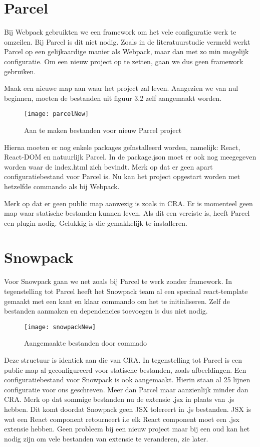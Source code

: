 \section{Parcel}
Bij Webpack gebruikten we een framework om het vele configuratie werk te omzeilen. Bij Parcel is dit niet nodig. Zoals in de literatuurstudie vermeld werkt Parcel op een gelijkaardige manier als Webpack, maar dan met zo min mogelijk configuratie. Om een nieuw project op te zetten, gaan we dus geen framework gebruiken.

Maak een nieuwe map aan waar het project zal leven. Aangezien we van nul beginnen, moeten de bestanden uit figuur 3.2 zelf aangemaakt worden.

\begin{figure}[h]
   \texttt{[image: parcelNew]}
       \centering
       \caption{Aan te maken bestanden voor nieuw Parcel project}
   \end{figure}

Hierna moeten er nog enkele packages geïnstalleerd worden, namelijk: React, React-DOM en natuurlijk Parcel. In de package.json moet er ook nog meegegeven worden waar de index.html zich bevindt. Merk op dat er geen apart configuratiebestand voor Parcel is. Nu kan het project opgestart worden met hetzelfde commando als bij Webpack.

 Merk op dat er geen public map aanwezig is zoals in CRA. Er is momenteel geen map waar statische bestanden kunnen leven. Als dit een vereiste is, heeft Parcel een plugin nodig. Gelukkig is die gemakkelijk te installeren.

\section{Snowpack}
Voor Snowpack gaan we net zoals bij Parcel te werk zonder framework. In tegenstelling tot Parcel heeft het Snowpack team al een speciaal react-template gemaakt met een kant en klaar commando om het te initialiseren. Zelf de bestanden aanmaken en dependencies toevoegen is dus niet nodig.


\begin{figure}[h]
   \texttt{[image: snowpackNew]}
       \centering
       \caption[Aangemaakte bestanden door Snowpack commando]{Aangemaakte bestanden door commado}
   \end{figure}

Deze structuur is identiek aan die van CRA. In tegenstelling tot Parcel is een public map al geconfigureerd voor statische bestanden, zoals afbeeldingen. Een configuratiebestand voor Snowpack is ook aangemaakt. Hierin staan al 25 lijnen configuratie voor ons geschreven. Meer dan Parcel maar aanzienlijk minder dan CRA. Merk op dat sommige bestanden nu de extensie .jsx in plaats van .js hebben. Dit komt doordat Snowpack geen JSX tolereert in .js bestanden. JSX is wat een React component retourneert i.e elk React component moet een .jsx extensie hebben. Geen probleem bij een nieuw project maar bij een oud kan het nodig zijn om vele bestanden van extensie te veranderen, zie later.

